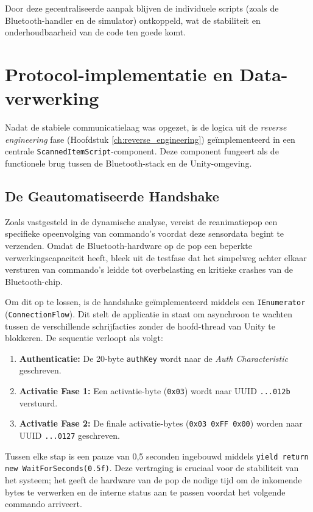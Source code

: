 Door deze gecentraliseerde aanpak blijven de individuele scripts (zoals de Bluetooth-handler en de simulator) ontkoppeld, wat de stabiliteit en onderhoudbaarheid van de code 
ten goede komt.

\section{Protocol-implementatie en Data-verwerking}
Nadat de stabiele communicatielaag was opgezet, is de logica uit de \textit{reverse engineering} fase (Hoofdstuk \ref{ch:reverse_engineering}) 
geïmplementeerd in een centrale \texttt{ScannedItemScript}-component. Deze component fungeert als de functionele brug tussen de Bluetooth-stack en de Unity-omgeving.

\subsection{De Geautomatiseerde Handshake}
Zoals vastgesteld in de dynamische analyse, vereist de reanimatiepop een specifieke opeenvolging van commando's voordat deze sensordata begint te verzenden. 
Omdat de Bluetooth-hardware op de pop een beperkte verwerkingscapaciteit heeft, bleek uit de testfase dat het simpelweg achter elkaar versturen van commando's 
leidde tot overbelasting en kritieke crashes van de Bluetooth-chip.

Om dit op te lossen, is de handshake geïmplementeerd middels een \texttt{IEnumerator} (\texttt{ConnectionFlow}). Dit stelt de applicatie in staat om asynchroon te 
wachten tussen de verschillende schrijfacties zonder de hoofd-thread van Unity te blokkeren. De sequentie verloopt als volgt:

\begin{enumerate}
    \item \textbf{Authenticatie:} De 20-byte \texttt{authKey} wordt naar de \textit{Auth Characteristic} geschreven.
    \item \textbf{Activatie Fase 1:} Een activatie-byte (\texttt{0x03}) wordt naar UUID \texttt{...012b} verstuurd.
    \item \textbf{Activatie Fase 2:} De finale activatie-bytes (\texttt{0x03 0xFF 0x00}) worden naar UUID \texttt{...0127} geschreven.
\end{enumerate}

Tussen elke stap is een pauze van 0,5 seconden ingebouwd middels \texttt{yield return new WaitForSeconds(0.5f)}. Deze vertraging is cruciaal voor de 
stabiliteit van het systeem; het geeft de hardware van de pop de nodige tijd om de inkomende bytes te verwerken en de interne status aan te passen voordat het 
volgende commando arriveert.

